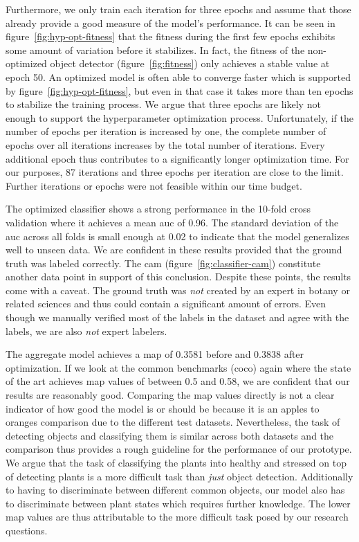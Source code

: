 \documentclass[final]{vutinfth} %
\begin{document}
Furthermore, we only train each iteration for three epochs and assume
that those already provide a good measure of the model's
performance. It can be seen in figure~\ref{fig:hyp-opt-fitness} that
the fitness during the first few epochs exhibits some amount of
variation before it stabilizes. In fact, the fitness of the
non-optimized object detector (figure~\ref{fig:fitness}) only achieves
a stable value at epoch \num{50}. An optimized model is often able to
converge faster which is supported by
figure~\ref{fig:hyp-opt-fitness}, but even in that case it takes more
than ten epochs to stabilize the training process. We argue that three
epochs are likely not enough to support the hyperparameter
optimization process. Unfortunately, if the number of epochs per
iteration is increased by one, the complete number of epochs over all
iterations increases by the total number of iterations. Every
additional epoch thus contributes to a significantly longer
optimization time. For our purposes, \num{87} iterations and three
epochs per iteration are close to the limit. Further iterations or
epochs were not feasible within our time budget.

The optimized classifier shows a strong performance in the
\num{10}-fold cross validation where it achieves a mean \gls{auc} of
\num{0.96}. The standard deviation of the \gls{auc} across all folds
is small enough at \num{0.02} to indicate that the model generalizes
well to unseen data. We are confident in these results provided that
the ground truth was labeled correctly. The \gls{cam}
(figure~\ref{fig:classifier-cam}) constitute another data point in
support of this conclusion. Despite these points, the results come
with a caveat. The ground truth was \emph{not} created by an expert in
botany or related sciences and thus could contain a significant amount
of errors. Even though we manually verified most of the labels in the
dataset and agree with the labels, we are also \emph{not} expert
labelers.

The aggregate model achieves a \gls{map} of \num{0.3581} before and
\num{0.3838} after optimization. If we look at the common benchmarks
(\gls{coco}) again where the state of the art achieves \gls{map}
values of between \num{0.5} and \num{0.58}, we are confident that our
results are reasonably good. Comparing the \gls{map} values directly
is not a clear indicator of how good the model is or should be because
it is an apples to oranges comparison due to the different test
datasets. Nevertheless, the task of detecting objects and classifying
them is similar across both datasets and the comparison thus provides
a rough guideline for the performance of our prototype. We argue that
the task of classifying the plants into healthy and stressed on top of
detecting plants is a more difficult task than \emph{just} object
detection. Additionally to having to discriminate between different
common objects, our model also has to discriminate between plant
states which requires further knowledge. The lower \gls{map} values
are thus attributable to the more difficult task posed by our research
questions.
\end{document}
